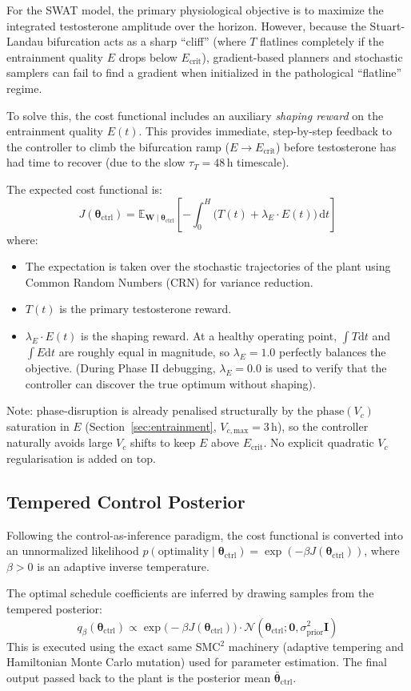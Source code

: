 \documentclass[11pt,a4paper]{article}
\begin{document}
For the SWAT model, the primary physiological objective is to maximize the integrated testosterone amplitude over the horizon. However, because the Stuart-Landau bifurcation acts as a sharp ``cliff'' (where $T$ flatlines completely if the entrainment quality $E$ drops below $E_{\text{crit}}$), gradient-based planners and stochastic samplers can fail to find a gradient when initialized in the pathological ``flatline'' regime.

To solve this, the cost functional includes an auxiliary \textit{shaping reward} on the entrainment quality $E(t)$. This provides immediate, step-by-step feedback to the controller to climb the bifurcation ramp ($E \to E_{\text{crit}}$) before testosterone has had time to recover (due to the slow $\tau_T = 48$\,h timescale). 

The expected cost functional is:
\[
J(\boldsymbol{\theta}_{\text{ctrl}}) = \mathbb{E}_{\mathbf{W} \mid \boldsymbol{\theta}_{\text{ctrl}}} \left[ - \int_0^H \Big( T(t) + \lambda_E \cdot E(t) \Big) \, \mathrm{d}t \right]
\]
where:
\begin{itemize}
    \item The expectation is taken over the stochastic trajectories of the plant using Common Random Numbers (CRN) for variance reduction.
    \item $T(t)$ is the primary testosterone reward.
    \item $\lambda_E \cdot E(t)$ is the shaping reward. At a healthy operating point, $\int T \mathrm{d}t$ and $\int E \mathrm{d}t$ are roughly equal in magnitude, so $\lambda_E = 1.0$ perfectly balances the objective. (During Phase II debugging, $\lambda_E = 0.0$ is used to verify that the controller can discover the true optimum without shaping).
\end{itemize}
Note: phase-disruption is already penalised structurally by the $\text{phase}(V_c)$ saturation in $E$ (Section~\ref{sec:entrainment}, $V_{c,\text{max}} = 3$\,h), so the controller naturally avoids large $V_c$ shifts to keep $E$ above $E_{\text{crit}}$. No explicit quadratic $V_c$ regularisation is added on top.

\subsection{Tempered Control Posterior}

Following the control-as-inference paradigm, the cost functional is converted into an unnormalized likelihood $p(\text{optimality} \mid \boldsymbol{\theta}_{\text{ctrl}}) = \exp(-\beta J(\boldsymbol{\theta}_{\text{ctrl}}))$, where $\beta > 0$ is an adaptive inverse temperature. 

The optimal schedule coefficients are inferred by drawing samples from the tempered posterior:
\[
q_\beta(\boldsymbol{\theta}_{\text{ctrl}}) \propto \exp\big(-\beta J(\boldsymbol{\theta}_{\text{ctrl}})\big) \cdot \mathcal{N}(\boldsymbol{\theta}_{\text{ctrl}}; \mathbf{0}, \sigma_{\text{prior}}^2 \mathbf{I})
\]
This is executed using the exact same SMC$^2$ machinery (adaptive tempering and Hamiltonian Monte Carlo mutation) used for parameter estimation. The final output passed back to the plant is the posterior mean $\bar{\boldsymbol{\theta}}_{\text{ctrl}}$.
\end{document}
